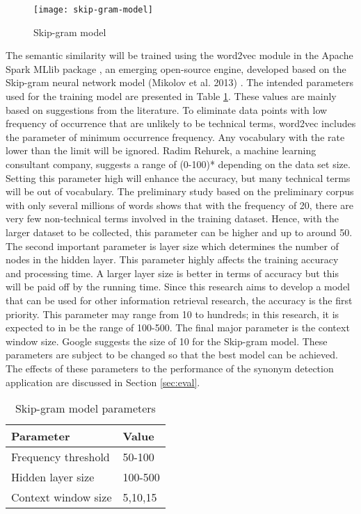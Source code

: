 \documentclass[Journal, InsideFigs, DoubleSpace]{ascelike} %
\begin{document}
\begin{figure}[t]
	\centering
	\texttt{[image: skip-gram-model]}
	\caption{Skip-gram model}
	\label{fig:skip-gram}
\end{figure}

The semantic similarity will be trained using the word2vec module in the Apache Spark MLlib package \cite{apache16}, an emerging open-source engine, developed based on the Skip-gram neural network model (Mikolov et al. 2013) \cite{mikolov13a}. The intended parameters used for the training model are presented in Table \ref{table:nn-parameters}. These values are mainly based on suggestions from the literature. To eliminate data points with low frequency of occurrence that are unlikely to be technical terms, word2vec includes the parameter of minimum occurrence frequency. Any vocabulary with the rate lower than the limit will be ignored. Radim Rehurek, a machine learning consultant company, suggests a range of (0-100)* depending on the data set size. Setting this parameter high will enhance the accuracy, but many technical terms will be out of vocabulary. The preliminary study based on the preliminary corpus with only several millions of words shows that with the frequency of 20, there are very few non-technical terms involved in the training dataset. Hence, with the larger dataset to be collected, this parameter can be higher and up to around 50. The second important parameter is layer size which determines the number of nodes in the hidden layer. This parameter highly affects the training accuracy and processing time. A larger layer size is better in terms of accuracy but this will be paid off by the running time. Since this research aims to develop a model that can be used for other information retrieval research, the accuracy is the first priority. This parameter may range from 10 to hundreds; in this research, it is expected to in be the range of 100-500. The final major parameter is the context window size. Google  suggests the size of 10 for the Skip-gram model. These parameters are subject to be changed so that the best model can be achieved. The effects of these parameters to the performance of the synonym detection application are discussed in Section \ref{sec:eval}.
%
\begin{table} [t]
\caption{Skip-gram model parameters}
\label{table:nn-parameters}
\centering
\small
\renewcommand{\arraystretch}{1.25}
\begin{tabular}{l l}
\hline
\textbf{Parameter} & \textbf{Value}\\
\hline
Frequency threshold & 50-100\\
Hidden layer size		&	100-500\\
Context window size	&	5,10,15\\
\hline
\end{tabular}
\normalsize
\end{table}
\end{document}
